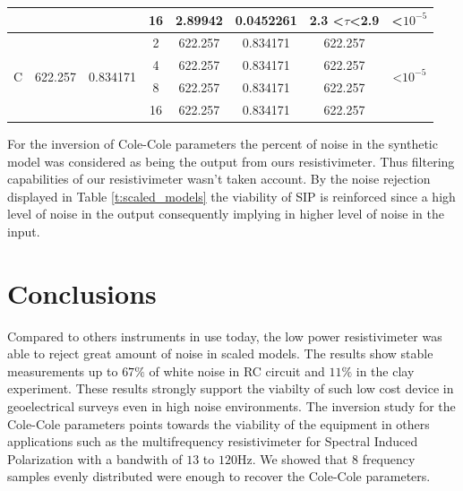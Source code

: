 \documentclass{vie16}
\begin{document}
\begin{table}[H]
\begin{adjustbox}{scale=0.9}
\begin{tabular}{@{}|c|c|c|c|c|c|c|c|@{}}
                   &                          &                            & 16                                 & 2.89942         & 0.0452261         & 2.3 \textless$\tau$\textless 2.9  & \textless $10^{-5}$                  \\ \hline
\multirow{4}{*}{C} & \multirow{4}{*}{622.257} & \multirow{4}{*}{0.834171}  & 2                                  & 622.257         & 0.834171          & 622.257                           & \multirow{4}{*}{\textless $10^{-5}$} \\
                   &                          &                            & 4                                  & 622.257         & 0.834171          & 622.257                           &                                      \\
                   &                          &                            & 8                                  & 622.257         & 0.834171          & 622.257                           &                                      \\
                   &                          &                            & 16                                 & 622.257         & 0.834171          & 622.257                           &                                   \\  \hline
\end{tabular}
\end{adjustbox}
\end{table}

For the inversion of Cole-Cole parameters the percent of noise in the
synthetic model was considered as being the output from ours
resistivimeter. Thus filtering capabilities of our resistivimeter
wasn't taken account. By the noise rejection displayed in Table \ref{t:scaled_models} the viability of SIP is reinforced since a high level of noise in the output consequently implying in higher level of noise in the input. 

\section{Conclusions}

Compared to others instruments in use today, the low power
resistivimeter was able to reject great amount of noise in scaled
models. The results show stable measurements up to $67\%$ of white
noise in RC circuit and $11 \%$ in the clay experiment. These results
strongly support the viabilty of such low cost device in geoelectrical
surveys even in high noise environments. The inversion study for the
Cole-Cole parameters points towards the viability of the equipment in
others applications such as the multifrequency resistivimeter for
Spectral Induced Polarization with a bandwith of $13$ to $120$Hz. We
showed that $8$ frequency samples evenly distributed were enough to
recover the Cole-Cole parameters.
\end{document}
